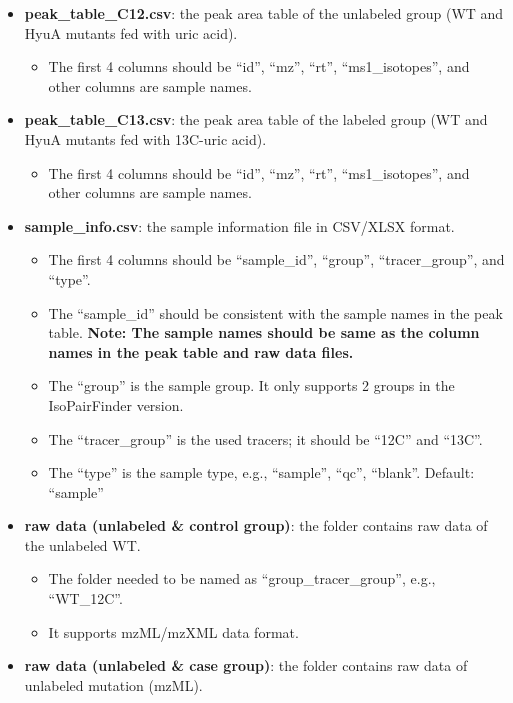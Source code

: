\documentclass[
  letterpaper,
  DIV=11,
  numbers=noendperiod]{scrreprt}
\providecommand{\tightlist}{%
  \setlength{\itemsep}{0pt}\setlength{\parskip}{0pt}}
\begin{document}
\begin{itemize}
\tightlist
\item
  \textbf{peak\_table\_C12.csv}: the peak area table of the unlabeled
  group (WT and HyuA mutants fed with uric acid).

  \begin{itemize}
  \tightlist
  \item
    The first 4 columns should be ``id'', ``mz'', ``rt'',
    ``ms1\_isotopes'', and other columns are sample names.
  \end{itemize}
\item
  \textbf{peak\_table\_C13.csv}: the peak area table of the labeled
  group (WT and HyuA mutants fed with 13C-uric acid).

  \begin{itemize}
  \tightlist
  \item
    The first 4 columns should be ``id'', ``mz'', ``rt'',
    ``ms1\_isotopes'', and other columns are sample names.
  \end{itemize}
\item
  \textbf{sample\_info.csv}: the sample information file in CSV/XLSX
  format.

  \begin{itemize}
  \tightlist
  \item
    The first 4 columns should be ``sample\_id'', ``group'',
    ``tracer\_group'', and ``type''.
  \item
    The ``sample\_id'' should be consistent with the sample names in the
    peak table. \textbf{Note: The sample names should be same as the
    column names in the peak table and raw data files.}
  \item
    The ``group'' is the sample group. It only supports 2 groups in the
    IsoPairFinder version.
  \item
    The ``tracer\_group'' is the used tracers; it should be ``12C'' and
    ``13C''.
  \item
    The ``type'' is the sample type, e.g., ``sample'', ``qc'',
    ``blank''. Default: ``sample''
  \end{itemize}
\item
  \textbf{raw data (unlabeled \& control group)}: the folder contains
  raw data of the unlabeled WT.

  \begin{itemize}
  \tightlist
  \item
    The folder needed to be named as ``group\_tracer\_group'', e.g.,
    ``WT\_12C''.
  \item
    It supports mzML/mzXML data format.
  \end{itemize}
\item
  \textbf{raw data (unlabeled \& case group)}: the folder contains raw
  data of unlabeled mutation (mzML).


\end{itemize}
\end{document}

